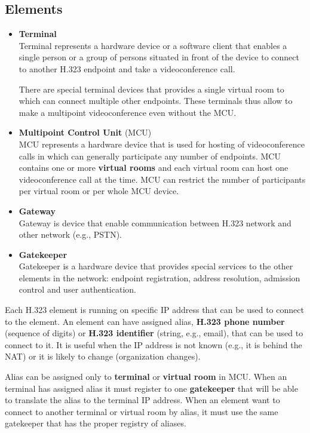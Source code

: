 \documentclass[a4paper]{report}
\begin{document}
\subsection{Elements}

\begin{itemize}

\item \textbf{Terminal} \\
Terminal represents a hardware device or a software client that enables a single person or a group of persons situated in front of the device to connect to another H.323 endpoint and take a videoconference call.

There are special terminal devices that provides a single virtual room to which can connect multiple other endpoints.  These terminals thus allow to make a multipoint videoconference even without the MCU.

\item \textbf{Multipoint Control Unit} (MCU) \\
MCU represents a hardware device that is used for hosting of videoconference calls in which can generally participate any number of endpoints. MCU contains one or more \textbf{virtual rooms} and each virtual room can host one videoconference call at the time. MCU can restrict the number of participants per virtual room or per whole MCU device.

\item \textbf{Gateway} \\
Gateway is device that enable communication between H.323 network and other network (e.g., PSTN).

\item \textbf{Gatekeeper} \\
Gatekeeper is a hardware device that provides special services to the other elements in the network: endpoint registration, address resolution, admission control and user authentication.

\end{itemize}

Each H.323 element is running on specific IP address that can be used to connect to the element. An element can have assigned alias, \textbf{H.323 phone number} (sequence of digits) or \textbf{H.323 identifier} (string, e.g., email), that can be used to connect to it. It is useful when the IP address is not known (e.g., it is behind the NAT) or it is likely to change (organization changes).

Alias can be assigned only to \textbf{terminal} or \textbf{virtual room} in MCU. When an terminal has assigned alias it must register to one \textbf{gatekeeper} that will be able to translate the alias to the terminal IP address. When an element want to connect to another terminal or virtual room by alias, it must use the same gatekeeper that has the proper registry of aliases.
\end{document}
